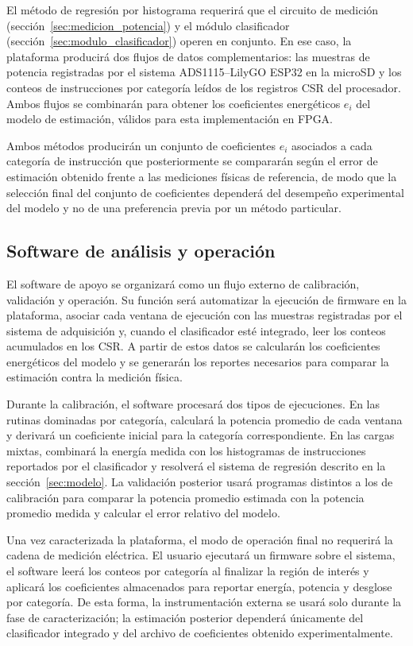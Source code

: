 El método de regresión por histograma requerirá que el circuito de medición
(sección~\ref{sec:medicion_potencia}) y el módulo clasificador
(sección~\ref{sec:modulo_clasificador}) operen en conjunto. En ese caso, la
plataforma producirá dos flujos de datos complementarios: las muestras de
potencia registradas por el sistema ADS1115--LilyGO ESP32 en la microSD y los
conteos de instrucciones por categoría leídos de los registros CSR del
procesador. Ambos flujos se combinarán para obtener los coeficientes energéticos
$e_i$ del modelo de estimación, válidos para esta implementación en FPGA.

Ambos métodos producirán un conjunto de coeficientes $e_i$ asociados a cada
categoría de instrucción que posteriormente se compararán según el error de
estimación obtenido frente a las mediciones físicas de referencia, de modo que
la selección final del conjunto de coeficientes dependerá del desempeño
experimental del modelo y no de una preferencia previa por un método
particular.

\subsection{Software de análisis y operación}
\label{sec:scripts_analisis}

El software de apoyo se organizará como un flujo externo de calibración,
validación y operación. Su función será automatizar la ejecución de firmware en
la plataforma, asociar cada ventana de ejecución con las muestras registradas
por el sistema de adquisición y, cuando el clasificador esté integrado, leer los
conteos acumulados en los CSR. A partir de estos datos se calcularán los
coeficientes energéticos del modelo y se generarán los reportes necesarios para
comparar la estimación contra la medición física.

Durante la calibración, el software procesará dos tipos de ejecuciones. En las
rutinas dominadas por categoría, calculará la potencia promedio de cada ventana
y derivará un coeficiente inicial para la categoría correspondiente. En las
cargas mixtas, combinará la energía medida con los histogramas de instrucciones
reportados por el clasificador y resolverá el sistema de regresión descrito en
la sección~\ref{sec:modelo}. La validación posterior usará programas distintos
a los de calibración para comparar la potencia promedio estimada con la potencia promedio medida y
calcular el error relativo del modelo.

Una vez caracterizada la plataforma, el modo de operación final no requerirá la
cadena de medición eléctrica. El usuario ejecutará un firmware sobre el sistema,
el software leerá los conteos por categoría al finalizar la región de interés y
aplicará los coeficientes almacenados para reportar energía, potencia y desglose
por categoría. De esta forma, la instrumentación externa se usará solo durante
la fase de caracterización; la estimación posterior dependerá únicamente del
clasificador integrado y del archivo de coeficientes obtenido experimentalmente.

